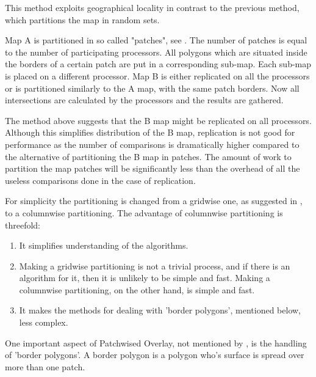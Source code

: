 This method exploits geographical locality in contrast to
the previous method, which partitions the map in random sets.

Map A is partitioned in so called "patches", see 
.
The number of patches is equal to the number of participating
processors.
All polygons which are situated inside the borders of a certain
patch are put in a corresponding sub-map.
Each sub-map is placed on a different processor.
Map B is either replicated on all the processors or is 
partitioned similarly to the A map, with the same patch borders.
Now all intersections are calculated by the processors and the
results are gathered.

\begin{figure}[hbtp]
  \begin{centering}
    \hspace{0cm}
  \end{centering}
\end{figure}

The method above suggests that the B map might be replicated
on all processors.
Although this simplifies distribution of the B map,
replication is not good for performance as the number of comparisons
is dramatically higher compared to the alternative of partitioning
the B map in patches.
The amount of work to partition the map patches will be
significantly less than the overhead of all the useless comparisons
done in the case of replication.

For simplicity the partitioning is changed from a gridwise one,
as suggested in
, to a columnwise partitioning.
The advantage of columnwise partitioning is threefold:
\begin{enumerate}
  \item
    It simplifies understanding of the algorithms.
  \item
    Making a gridwise partitioning is not a trivial process,
    and if there is an algorithm for it, then it is unlikely to be simple
    and fast.
    Making a columnwise partitioning, on the other hand, is simple and fast.
  \item
    It makes the methods for dealing with 'border polygons',
    mentioned below, less complex.
\end{enumerate}

One important aspect of Patchwised Overlay, not mentioned  by
\cite{Wilson:1994}, is the handling of 'border polygons'.
A border polygon is a polygon who's surface is spread over more
than one patch.

